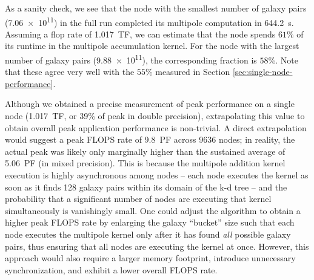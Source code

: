 As a sanity check, we see that the node with the smallest number of galaxy
pairs (\num{7.06e11}) in the full run completed its multipole computation in
644.2~\si{\second}. Assuming a flop rate of 1.017~TF, we can estimate that
the node spends $61\%$ of its runtime in the multipole accumulation kernel. For
the node with the largest number of galaxy pairs (\num{9.88e11}), the
corresponding fraction is $58\%$. Note that these agree very well with the
$55\%$ measured in Section \ref{sec:single-node-performance}.

Although we obtained a precise measurement of peak performance on a single node
(1.017~TF, or 39\% of peak in double precision), extrapolating this value to
obtain overall peak application performance is non-trivial. A direct
extrapolation would suggest a peak FLOPS rate of 9.8~PF across 9636 nodes; in
reality, the actual peak was likely only marginally higher than the sustained
average of 5.06~PF (in mixed precision). This is because the multipole addition
kernel execution is highly asynchronous among nodes -- each node executes the
kernel as soon as it finds 128 galaxy pairs within its domain of the k-d tree
-- and the probability that a significant number of nodes are executing that
kernel simultaneously is vanishingly small. One could adjust the algorithm to
obtain a higher peak FLOPS rate by enlarging the galaxy ``bucket'' size such
that each node executes the multipole kernel only after it has found \emph{all}
possible galaxy pairs, thus ensuring that all nodes are executing the kernel at
once. However, this approach would also require a larger memory footprint,
introduce unnecessary synchronization, and exhibit a lower overall FLOPS rate.
